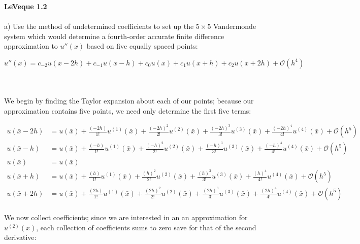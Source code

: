\textbf{LeVeque 1.2} \\\\
a)  Use the method of undetermined coefficients to set up the $5\times5$ Vandermonde system which would determine a 
  fourth-order accurate finite difference approximation to $u''(x)$ based on five equally spaced points:

  $$
    u''(x) = c_{-2}u(x-2h) + c_{-1}u(x-h) + c_0u(x) + c_1u(x+h) + c_2u(x+2h) + \mathcal{O}(h^4)
  $$


\begin{solution}\ \\\\
    We begin by finding the Taylor expansion about each of our points; because our approximation contains five points,
    we need only determine the first five terms:

    \begin{align*}
    u(\bar{x} - 2h) &= u(\bar{x}) + \frac{(-2h)}{1!}u^{(1)}(\bar{x}) 
                                 + \frac{(-2h)^2}{2!}u^{(2)}(\bar{x}) 
                                 + \frac{(-2h)^3}{3!}u^{(3)}(\bar{x})
                                 + \frac{(-2h)^4}{4!}u^{(4)}(\bar{x})
                                 + \mathcal{O}(h^5) \\
    u(\bar{x} - h) &= u(\bar{x}) + \frac{(-h)}{1!}u^{(1)}(\bar{x}) 
                                 + \frac{(-h)^2}{2!}u^{(2)}(\bar{x}) 
                                 + \frac{(-h)^3}{3!}u^{(3)}(\bar{x})
                                 + \frac{(-h)^4}{4!}u^{(4)}(\bar{x})
                                 + \mathcal{O}(h^5) \\
    u(\bar{x}) &= u(\bar{x}) \\
    u(\bar{x} + h) &= u(\bar{x}) + \frac{(h)}{1!}u^{(1)}(\bar{x}) 
                                 + \frac{(h)^2}{2!}u^{(2)}(\bar{x}) 
                                 + \frac{(h)^3}{3!}u^{(3)}(\bar{x})
                                 + \frac{(h)^4}{4!}u^{(4)}(\bar{x})
                                 + \mathcal{O}(h^5) \\
    u(\bar{x} + 2h) &= u(\bar{x}) + \frac{(2h)}{1!}u^{(1)}(\bar{x}) 
                                 + \frac{(2h)^2}{2!}u^{(2)}(\bar{x}) 
                                 + \frac{(2h)^3}{3!}u^{(3)}(\bar{x})
                                 + \frac{(2h)^4}{4!}u^{(4)}(\bar{x})
                                 + \mathcal{O}(h^5) \\
    \end{align*}

    We now collect coefficients; since we are interested in an an approximation for $u^{(2)}(x)$, each
    collection of coefficients sums to zero save for that of the second derivative:


\end{solution}
